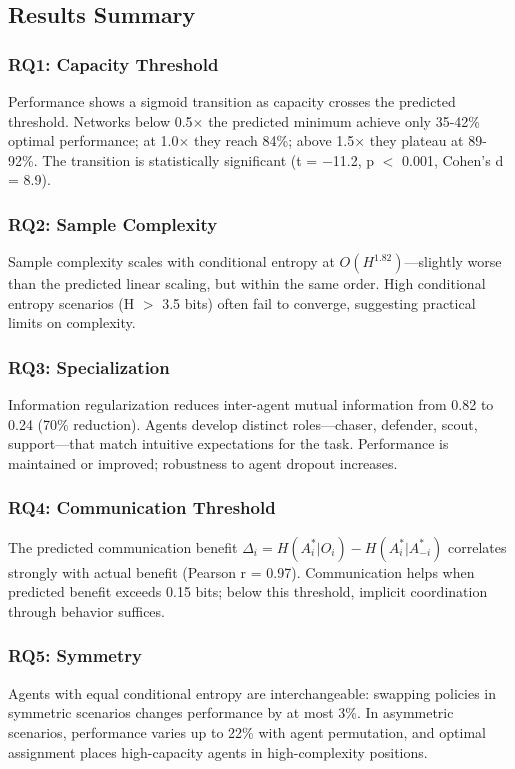 \documentclass[10pt, letterpaper]{article}
\begin{document}
\subsection{Results Summary}

\subsubsection{RQ1: Capacity Threshold}
Performance shows a sigmoid transition as capacity crosses the predicted threshold. Networks below 0.5$\times$ the predicted minimum achieve only 35-42\% optimal performance; at 1.0$\times$ they reach 84\%; above 1.5$\times$ they plateau at 89-92\%. The transition is statistically significant (t = $-$11.2, p $<$ 0.001, Cohen's d = 8.9).

\subsubsection{RQ2: Sample Complexity}
Sample complexity scales with conditional entropy at $O(H^{1.82})$---slightly worse than the predicted linear scaling, but within the same order. High conditional entropy scenarios (H $>$ 3.5 bits) often fail to converge, suggesting practical limits on complexity.

\subsubsection{RQ3: Specialization}
Information regularization reduces inter-agent mutual information from 0.82 to 0.24 (70\% reduction). Agents develop distinct roles---chaser, defender, scout, support---that match intuitive expectations for the task. Performance is maintained or improved; robustness to agent dropout increases.

\subsubsection{RQ4: Communication Threshold}
The predicted communication benefit $\Delta_i = H(A_i^*|O_i) - H(A_i^*|A_{-i}^*)$ correlates strongly with actual benefit (Pearson r = 0.97). Communication helps when predicted benefit exceeds 0.15 bits; below this threshold, implicit coordination through behavior suffices.

\subsubsection{RQ5: Symmetry}
Agents with equal conditional entropy are interchangeable: swapping policies in symmetric scenarios changes performance by at most 3\%. In asymmetric scenarios, performance varies up to 22\% with agent permutation, and optimal assignment places high-capacity agents in high-complexity positions.
\end{document}
